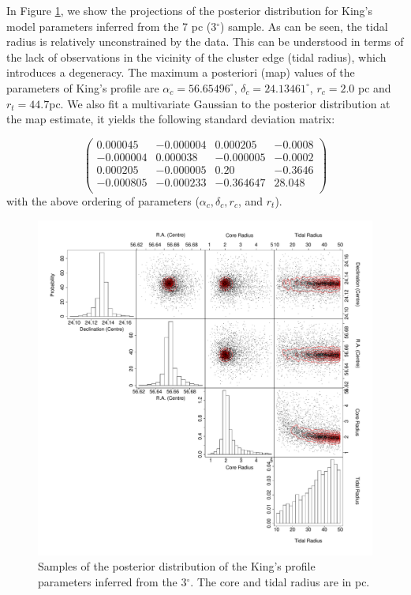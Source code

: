 In Figure \ref{fig:King_7}, we show the projections of the posterior distribution for King's model parameters inferred from the 7 pc (3$^{\circ}$) sample. As can be seen, the tidal radius is relatively unconstrained by the data. This can be understood in terms of the lack of observations in the vicinity of the cluster edge (tidal radius), which introduces a degeneracy. The maximum a posteriori (\gls{map}) values of the parameters of King's profile are $\alpha_c=56.65496^{\circ}$, $\delta_c=24.13461^{\circ}$, $r_c=2.0$ pc and $r_t=44.7$pc. We also fit a multivariate Gaussian to the posterior distribution at the \gls{map} estimate, it yields the following standard deviation matrix:

$$
\left(\begin{array}{rrrr}
 0.000045   & -0.000004  &  0.000205  & -0.0008  \\
-0.000004   &  0.000038  & -0.000005  & -0.0002  \\
 0.000205   & -0.000005  &  0.20      & -0.3646  \\
-0.000805   & -0.000233  & -0.364647  &  28.048  \\
\end{array}\right)
$$
with the above ordering of parameters ($\alpha_c, \delta_c, r_c$, and $r_t$). 

\begin{figure}[htbp]
\begin{center}
\includegraphics[width=\textwidth]{background/Figures/PSD/King7.pdf}
\caption{Samples of the posterior distribution of the King's profile parameters inferred from the 3$^{\circ}$. The core and tidal radius are in pc. }
\label{fig:King_7}
\end{center}
\end{figure}


